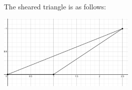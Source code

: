 \documentclass[11pt, letterpaper, twoside]{article}
\begin{document}
\begin{enumerate}
\begin{enumerate}[label=\alph*)]
The sheared triangle is as follows:

\includegraphics[width=0.5\textwidth]{q5b}\par\vspace{1cm}
\end{enumerate}
\end{enumerate}
\end{document}
